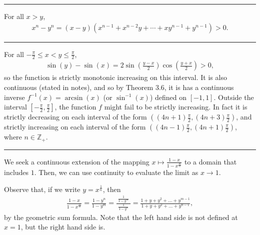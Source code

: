 \documentclass[letterpaper,10pt,english]{jupyterBook}
\begin{document}
\bigskip\hrule\bigskip


\sphinxAtStartPar
{\hyperref[\detokenize{Problems:id31}]{}} For all \(x > y\),
\begin{equation*}
\begin{split}
x^{n} - y^{n} = (x - y)(x^{n-1} + x^{n-2}y + \cdots + xy^{n-1} + y^{n-1}) > 0.
\end{split}
\end{equation*}

\bigskip\hrule\bigskip


\sphinxAtStartPar
{\hyperref[\detokenize{Problems:id32}]{}} For all \(-\frac{\pi}{2} \leq x < y \leq \frac{\pi}{2}\),
\begin{equation*}
\begin{split}
\sin(y) - \sin(x) = 2\sin\left(\frac{y - x}{2}\right)\cos\left(\frac{y + x}{2}\right) > 0,
\end{split}
\end{equation*}
\sphinxAtStartPar
so the function is strictly monotonic increasing on this interval. It is also continuous (stated in notes), and so by Theorem 3.6, it is has a continuous inverse \(f^{-1}(x) = \arcsin(x)\) (or \(\sin^{-1}(x)\)) defined on \([-1, 1]\). Outside the interval \(\left[-\frac{\pi}{2}, \frac{\pi}{2}\right]\), the function \(f\) might fail to be strictly increasing. In fact it is strictly decreasing on each interval of the form \(\left((4n+1)\frac{\pi}{2}, (4n + 3)\frac{\pi}{2}\right)\), and strictly increasing on each interval of the form \(\left((4n-1)\frac{\pi}{2}, (4n + 1)\frac{\pi}{2}\right)\), where \(n\in\mathbb{Z}_+\).


\bigskip\hrule\bigskip


\sphinxAtStartPar
{\hyperref[\detokenize{Problems:id33}]{}} We seek a continuous extension of the mapping \(x\mapsto \frac{1-x}{1-x^{\frac{m}{n}}}\) to a domain that includes \(1\). Then, we can use continuity to evaluate the limit as \(x\rightarrow 1\).

Observe that, if we write \(y = x^{\frac{1}{n}}\), then
\begin{equation*}
\begin{split}
\frac{1 - x}{1 - x^{\frac{m}{n}}} = \frac{1 - y^{n}}{1 - y^{m}} = \frac{\;\frac{1}{1-y^m}\;}{\;\frac{1}{1-y^n}\;} = \frac{1+y+y^2+\ldots+y^{m-1}}{1+y+y^2+\ldots+y^{n-1}},
\end{split}
\end{equation*}
\sphinxAtStartPar
by the geometric sum formula. Note that the left hand side is not defined at \(x=1\), but the right hand side is.
\end{document}
